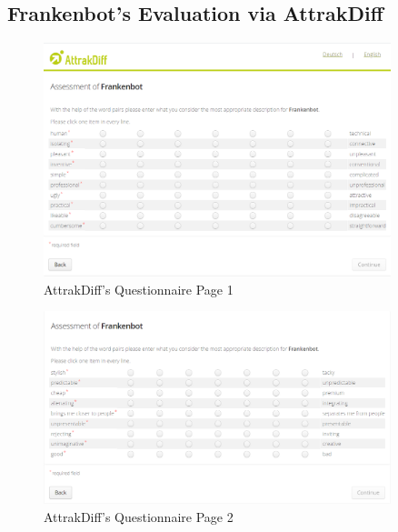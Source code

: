 \begin{appendix}
\subsection{Frankenbot's Evaluation via AttrakDiff\label{appen:attrsurvey}}
\begin{figure}[!h]
    \centering
    \includegraphics[width=0.9\textwidth]{img/AttrakDiff_Survey_1.PNG}
    \caption{AttrakDiff's Questionnaire Page 1 \cite{attrakdiff}}
    \label{fig:attr1}
\end{figure}

\begin{figure}[!h]
    \centering
    \includegraphics[width=0.9\textwidth]{img/AttrakDiff_Survey_2.PNG}
    \caption{AttrakDiff's Questionnaire Page 2 \cite{attrakdiff}}
    \label{fig:attr2}
\end{figure}


\end{appendix}
